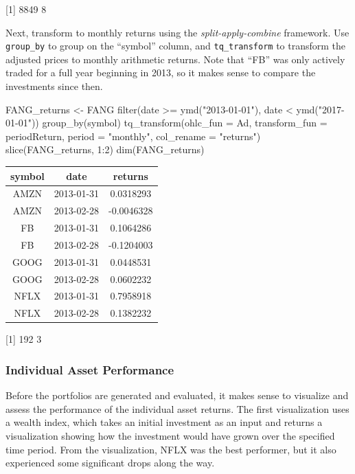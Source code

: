 {[}1{]} 8849 8

\hspace{20 mm}

Next, transform to monthly returns using the \emph{split-apply-combine}
framework. Use \texttt{group\_by} to group on the ``symbol'' column, and
\texttt{tq\_transform} to transform the adjusted prices to monthly
arithmetic returns. Note that ``FB'' was only actively traded for a full
year beginning in 2013, so it makes sense to compare the investments
since then.

\begin{Schunk}
\begin{Sinput}
FANG_returns <- FANG %
    filter(date >= ymd("2013-01-01"),
           date <  ymd("2017-01-01")) %
    group_by(symbol) %
    tq_transform(ohlc_fun = Ad,
                 transform_fun = periodReturn,
                 period = "monthly",
                 col_rename = "returns")
slice(FANG_returns, 1:2)
dim(FANG_returns)
\end{Sinput}
\end{Schunk}

\begin{tabular}{ccc}
\toprule
symbol & date & returns\\
\midrule
AMZN & 2013-01-31 & 0.0318293\\
AMZN & 2013-02-28 & -0.0046328\\
FB & 2013-01-31 & 0.1064286\\
FB & 2013-02-28 & -0.1204003\\
GOOG & 2013-01-31 & 0.0448531\\
\addlinespace
GOOG & 2013-02-28 & 0.0602232\\
NFLX & 2013-01-31 & 0.7958918\\
NFLX & 2013-02-28 & 0.1382232\\
\bottomrule
\end{tabular}

{[}1{]} 192 3

\hspace{20 mm}

\subsubsection{Individual Asset
Performance}\label{individual-asset-performance}

Before the portfolios are generated and evaluated, it makes sense to
visualize and assess the performance of the individual asset returns.
The first visualization uses a wealth index, which takes an initial
investment as an input and returns a visualization showing how the
investment would have grown over the specified time period. From the
visualization, NFLX was the best performer, but it also experienced some
significant drops along the way.

